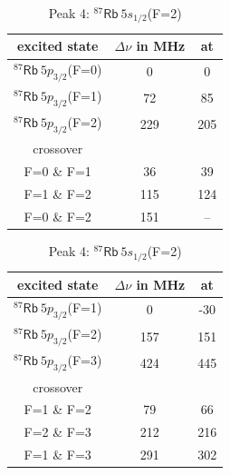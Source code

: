 \begin{table}[h]
   \centering
   \caption{Lamb dips observed for the different peaks}
	\label{tab:dips}
   \begin{subtable}{0.48\textwidth}
	\centering
	\caption{Peak 1: $^{87}\mathsf{Rb}~5s_{1/2}$(F=1)}
	\begin{tabular}{ccc}
		\toprule
		 excited state 					& $\Delta \nu$ in MHz	& at \\
		\midrule
		$^{87}\mathsf{Rb}~5p_{3/2}$(F=0)	& 0					& 0		\\
		$^{87}\mathsf{Rb}~5p_{3/2}$(F=1)	& 72					& 85		\\
		$^{87}\mathsf{Rb}~5p_{3/2}$(F=2)	& 229				& 205	\\[1ex]
		crossover		\\[-0.5ex]
		\midrule
		F=0 \& F=1					& 36					& 39		\\
		F=1 \& F=2					& 115				& 124	\\
		F=0 \& F=2					& 151				& --		\\
		\bottomrule
	\end{tabular}
   \end{subtable}
   \hfill
   \begin{subtable}{0.48\textwidth}
	\centering
	\caption{Peak 4: $^{87}\mathsf{Rb}~5s_{1/2}$(F=2)}
	\begin{tabular}{ccc}
		\toprule
		 excited state 					& $\Delta \nu$ in MHz	& at \\
		\midrule
		$^{87}\mathsf{Rb}~5p_{3/2}$(F=1)	& 0					& -30		\\
		$^{87}\mathsf{Rb}~5p_{3/2}$(F=2)	& 157				& 151	\\
		$^{87}\mathsf{Rb}~5p_{3/2}$(F=3)	& 424				& 445	\\[1ex]
		crossover		\\[-0.5ex]
		\midrule
		F=1 \& F=2					& 79					& 66		\\
		F=2 \& F=3					& 212				& 216	\\
		F=1 \& F=3					& 291				& 302	\\
		\bottomrule
	\end{tabular}
   \end{subtable}
   \\[2em]


\end{table}
